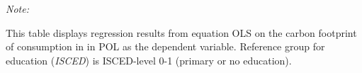 \begin{table}[htbp!]
\begin{adjustbox}{width = 1\textwidth, max height = 0.95\textheight, center}
\begin{threeparttable}[b]
         \begin{tablenotes}\item \medskip \textit{Note:}
            \item This table displays regression results from equation OLS on the carbon footprint of consumption in  in POL as the dependent variable.  Reference group for education (\textit{ISCED}) is ISCED-level 0-1 (primary or no education).
         \end{tablenotes}
      \end{threeparttable}
   \end{adjustbox}
\end{table}



